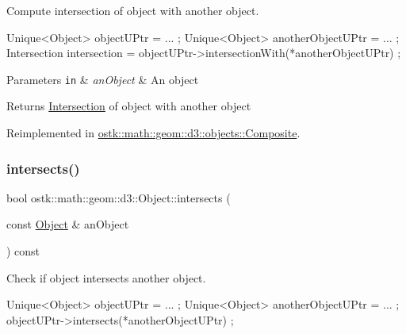Compute intersection of object with another object. 


\begin{DoxyCode}
Unique<Object> objectUPtr = ... ;
Unique<Object> anotherObjectUPtr = ... ;
Intersection intersection = objectUPtr->intersectionWith(*anotherObjectUPtr) ;
\end{DoxyCode}



\begin{DoxyParams}[1]{Parameters}
\mbox{\tt in}  & {\em an\+Object} & An object \\
\hline
\end{DoxyParams}
\begin{DoxyReturn}{Returns}
\hyperlink{classostk_1_1math_1_1geom_1_1d3_1_1_intersection}{Intersection} of object with another object 
\end{DoxyReturn}


Reimplemented in \hyperlink{classostk_1_1math_1_1geom_1_1d3_1_1objects_1_1_composite_a5c234652e274b4c2df015f89c2d3e90f}{ostk\+::math\+::geom\+::d3\+::objects\+::\+Composite}.

\mbox{\label{classostk_1_1math_1_1geom_1_1d3_1_1_object_a99bfe722e7508a09a629c9eb972201e6}} 
\subsubsection{\texorpdfstring{intersects()}{intersects()}}
{\footnotesize\ttfamily bool ostk\+::math\+::geom\+::d3\+::\+Object\+::intersects (\begin{DoxyParamCaption}\item[{const \hyperlink{classostk_1_1math_1_1geom_1_1d3_1_1_object}{Object} \&}]{an\+Object }\end{DoxyParamCaption}) const\hspace{0.3cm}{\ttfamily [virtual]}}



Check if object intersects another object. 


\begin{DoxyCode}
Unique<Object> objectUPtr = ... ;
Unique<Object> anotherObjectUPtr = ... ;
objectUPtr->intersects(*anotherObjectUPtr) ;
\end{DoxyCode}



